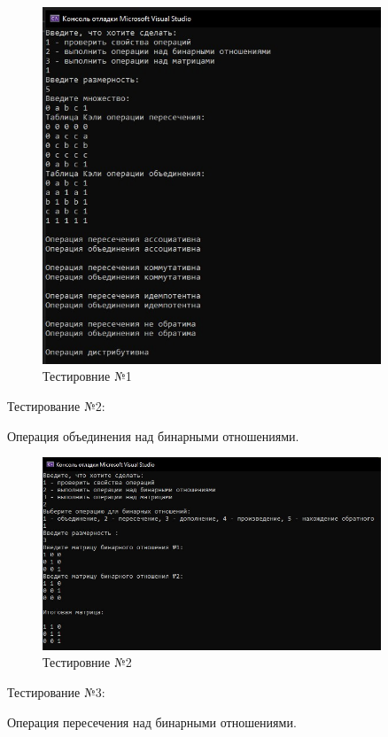 \documentclass[bachelor, och, labwork]{shiza}
\begin{document}
	\begin{figure}[H]
		\centering
		\includegraphics[width=0.9\textwidth]{test_1}
		\caption{Тестировние №1}
		\label{fig:test_1}
	\end{figure}
	
	Тестирование №2:
	
Операция объединения над бинарными отношениями.
	
	\begin{figure}[H]
		\centering
		\includegraphics[width=0.9\textwidth]{test_2}
		\caption{Тестировние №2}
		\label{fig:test_2}
	\end{figure}
	
	Тестирование №3:

Операция пересечения над бинарными отношениями.
\end{document}
